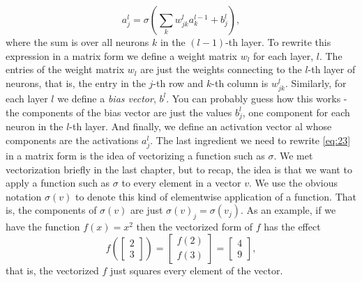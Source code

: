 \documentclass[a4paper,twoside,10pt]{book}
\begin{document}
\begin{equation}
	a^{l}_j = \sigma\left( \sum_k w^{l}_{jk} a^{l-1}_k + b^l_j \right),\label{eq:23}
\end{equation}
where the sum is over all neurons $k$ in the $(l-1)$-th layer. To rewrite this expression in a matrix form we define a weight matrix $w_l$ for each layer, $l$. The entries of the weight matrix $w_l$ are just the weights connecting to the $l$-th layer of neurons, that is, the entry in the $j$-th row and $k$-th column is $w^l_{jk}$. Similarly, for each layer $l$ we define a \textit{bias vector}, $b^l$. You can probably guess how this works - the components of the bias vector are just the values $b^l_j$, one component for each neuron in the $l$-th layer. And finally, we define an activation vector al whose components are the activations $a^l_j$.
The last ingredient we need to rewrite \ref{eq:23} in a matrix form is the idea of vectorizing a function such as $\sigma$. We met vectorization briefly in the last chapter, but to recap, the idea is that we want to apply a function such as $\sigma$ to every element in a vector $v$. We use the obvious notation $\sigma(v)$ to denote this kind of elementwise application of a function. That is, the components of $\sigma(v)$ are just $\sigma(v)_j = \sigma(v_j)$. As an example, if we have the function $f(x)=x^2$ then the vectorized form of $f$ has the effect
\begin{equation}
f\left(\left[ \begin{array}{c} 2 \\ 3 \end{array} \right] \right)
= \left[ \begin{array}{c} f(2) \\ f(3) \end{array} \right]
= \left[ \begin{array}{c} 4 \\ 9 \end{array} \right],
\label{eq:24}
\end{equation}
that is, the vectorized $f$ just squares every element of the vector.
\end{document}
